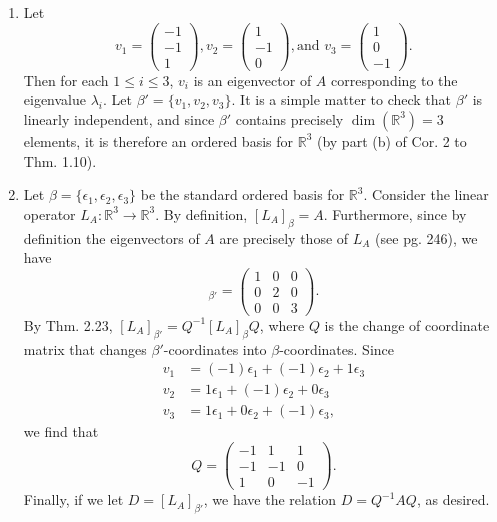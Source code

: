 \documentclass[12pt]{article}
\begin{document}
\begin{enumerate}
\begin{enumerate}
\begin{enumerate}[label=(\roman*)]
\item
Let
\begin{equation*}
v_1 = \begin{pmatrix}
-1 \\
-1 \\
1
\end{pmatrix},
v_2 = \begin{pmatrix}
1 \\
-1 \\
0
\end{pmatrix}, \text{and }
v_3 = \begin{pmatrix}
1 \\
0 \\
-1
\end{pmatrix}.
\end{equation*}
Then for each $1 \leq i \leq 3$, $v_i$ is an eigenvector of $A$ corresponding to the eigenvalue $\lambda_i$. Let $\beta' = \{v_1, v_2, v_3\}$. It is a simple matter to check that $\beta'$ is linearly independent, and since $\beta'$ contains precisely $\dim(\mathbb{R}^3) = 3$ elements, it is therefore an ordered basis for $\mathbb{R}^3$ (by part (b) of Cor. 2 to Thm. 1.10).

\item
Let $\beta = \{\epsilon_1, \epsilon_2, \epsilon_3\}$ be the standard ordered basis for $\mathbb{R}^3$. Consider the linear operator $L_A : \mathbb{R}^3 \to \mathbb{R}^3$. By definition, $[L_A]_\beta = A$. Furthermore, since by definition the eigenvectors of $A$ are precisely those of $L_A$ (see pg. 246), we have
\begin{equation*}
[L_A]_{\beta'} = \begin{pmatrix}
1 & 0 & 0 \\
0 & 2 & 0 \\
0 & 0 & 3
\end{pmatrix}.
\end{equation*}
By Thm. 2.23, $[L_A]_{\beta'} = Q^{-1}[L_A]_\beta Q$, where $Q$ is the change of coordinate matrix that changes $\beta'$-coordinates into $\beta$-coordinates. Since
\begin{align*}
v_1 &= (-1)\epsilon_1 + (-1)\epsilon_2 + 1\epsilon_3 \\
v_2 &= 1\epsilon_1 + (-1)\epsilon_2 + 0\epsilon_3 \\
v_3 &= 1\epsilon_1 + 0\epsilon_2 + (-1)\epsilon_3,
\end{align*}
we find that
\begin{equation*}
Q = \begin{pmatrix}
-1 & 1 & 1 \\
-1 & -1 & 0 \\
1 & 0 & -1
\end{pmatrix}.
\end{equation*}
Finally, if we let $D = [L_A]_{\beta'}$, we have the relation $D = Q^{-1} A Q$, as desired.


\end{enumerate}
\end{enumerate}
\end{enumerate}
\end{document}
